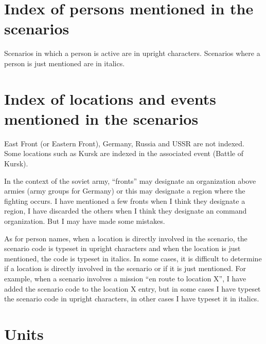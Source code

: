 \documentclass[a4paper,twocolumn]{article}
\begin{document}
\section*{Index of persons mentioned in the scenarios}

Scenarios in which a person is active are in upright characters.
Scenarios where a person is just mentioned are in italics.

\vspace{3mm}


\section*{Index of locations and events mentioned in the scenarios}

East Front (or Eastern Front), Germany, Russia and USSR are not
indexed. Some locations such as Kursk are indexed in the associated
event (Battle of Kursk).

\vspace{3mm}

In the context of the soviet army, ``fronts'' may designate an
organization above armies (army groups for Germany) or this may
designate a region where the fighting occurs. I have mentioned a few
fronts when I think they designate a region, I have discarded the
others when I think they designate an command organization.
But I may have made some mistakes.

\vspace{3mm}

As for person names, when a location is directly involved in the
scenario, the scenario code is typeset in upright characters and when
the location is just mentioned, the code is typeset in italics.
In some cases, it is difficult to determine if a location is directly
involved in the scenario or if it is just mentioned. For example, when
a scenario involves a mission ``en route to location X'', I have
added the scenario code to the location X entry, but in some cases I have
typeset the scenario code in upright characters, in other cases I have
typeset it in italics.

\vspace{3mm}


\section*{Units}
\end{document}
